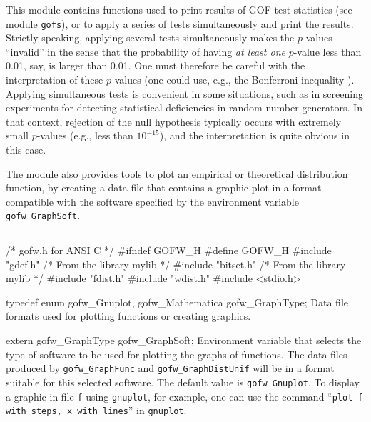 
This module contains functions used to print results of GOF
test statistics (see module {\tt gofs}), or to apply a series of tests
simultaneously and print the results.
Strictly speaking, applying several tests simultaneously makes the 
$p$-values ``invalid'' in the sense that the probability of having 
{\em at least one\/} $p$-value less than 0.01, say, is larger than 0.01.
One must therefore be careful with the interpretation of these 
$p$-values (one could use, e.g., the Bonferroni inequality \cite{sLAW00a}).
Applying simultaneous tests is convenient in some situations, such as in 
screening experiments for detecting statistical deficiencies 
in random number generators.  In that context, rejection of the null
hypothesis typically occurs with extremely small $p$-values (e.g., less
than $10^{-15}$), and the interpretation is quite obvious in this case.


The module also provides tools to plot an empirical or
theoretical distribution function, by creating a data file that
contains a graphic plot in a format compatible with the software
specified by the environment variable {\tt gofw\_GraphSoft}.


\bigskip\hrule\medskip
\code\hide
/* gofw.h for ANSI C */
#ifndef GOFW_H
#define GOFW_H
\endhide
#include "gdef.h"           /* From the library mylib */
#include "bitset.h"         /* From the library mylib */
#include "fdist.h"
#include "wdist.h"
#include <stdio.h>
\endcode


\code

typedef enum {
   gofw_Gnuplot,
   gofw_Mathematica
   } gofw_GraphType;
\endcode
 \tab  Data file formats used for plotting functions or creating graphics.
 \endtab
\code


extern gofw_GraphType gofw_GraphSoft;
\endcode
 \tab Environment variable that selects the type of software to be 
   used for plotting the graphs of functions.
   The data files produced by {\tt gofw\_GraphFunc} and 
   {\tt gofw\_GraphDistUnif} will be in a format suitable 
   for this selected software.
   The default value is {\tt gofw\_Gnuplot}.
   To display a graphic in file {\tt f} using {\tt gnuplot}, for example,
   one can use the command ``{\tt plot f with steps, x with lines}''
   in {\tt gnuplot}.
 \endtab
\code


